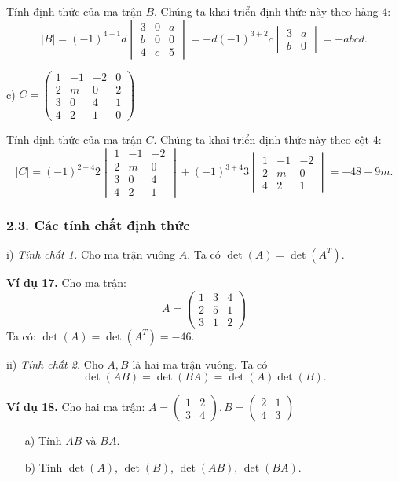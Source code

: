 Tính định thức của ma trận \(B\). Chúng ta khai triển định thức này theo hàng 4:
\[
|B| = (-1)^{4+1} d \begin{vmatrix}
3 & 0 & a \\
b & 0 & 0 \\
4 & c & 5
\end{vmatrix}
= -d(-1)^{3+2} c \begin{vmatrix}
3 & a \\
b & 0
\end{vmatrix}
= -abcd.
\]

c) \( C = \begin{pmatrix}
1 & -1 & -2 & 0 \\
2 & m & 0 & 2 \\
3 & 0 & 4 & 1 \\
4 & 2 & 1 & 0
\end{pmatrix} \)

Tính định thức của ma trận \(C\). Chúng ta khai triển định thức này theo cột 4:
\[
|C| = (-1)^{2+4} 2 \begin{vmatrix}
1 & -1 & -2 \\
2 & m & 0 \\
3 & 0 & 4 \\
4 & 2 & 1
\end{vmatrix}
+ (-1)^{3+4} 3 \begin{vmatrix}
1 & -1 & -2 \\
2 & m & 0 \\
4 & 2 & 1
\end{vmatrix}
= -48 - 9m.
\]
\subsubsection*{2.3. Các tính chất định thức}

i) \textit{Tính chất 1.} Cho ma trận vuông \(A\). Ta có \(\det(A) = \det(A^T)\).

\textbf{Ví dụ 17.} Cho ma trận:
\[
A = \begin{pmatrix}
1 & 3 & 4 \\
2 & 5 & 1 \\
3 & 1 & 2
\end{pmatrix}
\]
Ta có: \(\det(A) = \det(A^T) = -46\).

ii) \textit{Tính chất 2.} Cho \(A, B\) là hai ma trận vuông. Ta có
\[
\det(AB) = \det(BA) = \det(A)\det(B).
\]

\textbf{Ví dụ 18.} Cho hai ma trận: \( A = \begin{pmatrix}
1 & 2 \\
3 & 4
\end{pmatrix}, B = \begin{pmatrix}
2 & 1 \\
4 & 3
\end{pmatrix} \)
\begin{itemize}
    \item[a)] Tính \( AB \) và \( BA \).
    \item[b)] Tính \(\det(A)\), \(\det(B)\), \(\det(AB)\), \(\det(BA)\).
\end{itemize}

